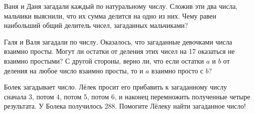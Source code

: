 ﻿
\begin{itemize}

\itA Ваня и Даня загадали каждый по натуральному числу. Сложив эти два числа, мальчики выяснили, что их сумма делится на одно из них. Чему равен наибольший общий делитель чисел, загаданных мальчиками?

\itB Галя и Валя загадали по числу. Оказалось, что загаданные девочками числа взаимно просты. Могут ли остатки от деления этих чисел на 17 оказаться не взаимно простыми? С другой стороны, верно ли, что если остатки $a$ и $b$ от деления на любое число взаимно просты, то и $a$ взаимно просто с $b$?

\itC Болек загадывает число. Лёлек просит его прибавить к загаданному числу сначала 3, потом 4, потом 5, потом 6, и наконец перемножить полученные четыре результата. У Болека получилось 288. Помогите Лёлеку найти загаданное число!
\end{itemize}